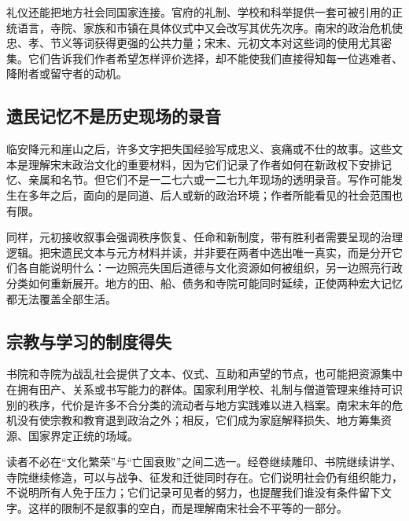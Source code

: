 礼仪还能把地方社会同国家连接。官府的礼制、学校和科举提供一套可被引用的正统语言，寺院、家族和市镇在具体仪式中又会改写其优先次序。南宋的政治危机使忠、孝、节义等词获得更强的公共力量；宋末、元初文本对这些词的使用尤其密集。它们告诉我们作者希望怎样评价选择，却不能使我们直接得知每一位逃难者、降附者或留守者的动机。

\subsection{遗民记忆不是历史现场的录音}

临安降元和崖山之后，许多文字把失国经验写成忠义、哀痛或不仕的故事。这些文本是理解宋末政治文化的重要材料，因为它们记录了作者如何在新政权下安排记忆、亲属和名节。但它们不是一二七六或一二七九年现场的透明录音。写作可能发生在多年之后，面向的是同道、后人或新的政治环境；作者所能看见的社会范围也有限。

同样，元初接收叙事会强调秩序恢复、任命和新制度，带有胜利者需要呈现的治理逻辑。把宋遗民文本与元方材料并读，并非要在两者中选出唯一真实，而是分开它们各自能说明什么：一边照亮失国后道德与文化资源如何被组织，另一边照亮行政分类如何重新展开。地方的田、船、债务和寺院可能同时延续，正使两种宏大记忆都无法覆盖全部生活。

\subsection{宗教与学习的制度得失}

书院和寺院为战乱社会提供了文本、仪式、互助和声望的节点，也可能把资源集中在拥有田产、关系或书写能力的群体。国家利用学校、礼制与僧道管理来维持可识别的秩序，代价是许多不合分类的流动者与地方实践难以进入档案。南宋末年的危机没有使宗教和教育退到政治之外；相反，它们成为家庭解释损失、地方筹集资源、国家界定正统的场域。

读者不必在“文化繁荣”与“亡国衰败”之间二选一。经卷继续雕印、书院继续讲学、寺院继续修造，可以与战争、征发和迁徙同时存在。它们说明社会仍有组织能力，不说明所有人免于压力；它们记录可见者的努力，也提醒我们谁没有条件留下文字。这样的限制不是叙事的空白，而是理解南宋社会不平等的一部分。
